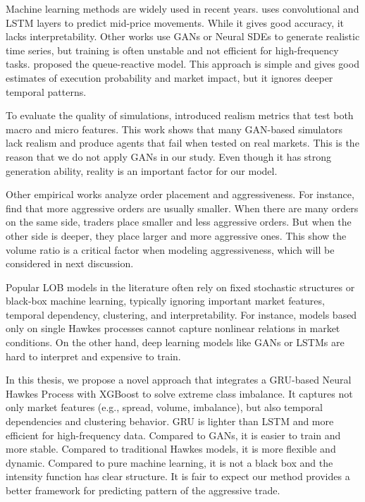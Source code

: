Machine learning methods are widely used in recent years. \cite{briola_deep_2024} uses convolutional and LSTM layers to predict mid-price movements. While it gives good accuracy, it lacks interpretability. Other works use GANs \citep{brophy_quick_2019} or Neural SDEs \citep{issa_non-adversarial_2023} to generate realistic time series, but training is often unstable and not efficient for high-frequency tasks. \cite{huang_simulating_2014} proposed the queue-reactive model. This approach is simple and gives good estimates of execution probability and market impact, but it ignores deeper temporal patterns.

To evaluate the quality of simulations, \cite{vyetrenko_get_2019} introduced realism metrics that test both macro and micro features. This work shows that many GAN-based simulators lack realism and produce agents that fail when tested on real markets. This is the reason that we do not apply GANs in our study. Even though it has strong generation ability, reality is an important factor for our model.

Other empirical works analyze order placement and aggressiveness. For instance, \cite{lo_order_2010} find that more aggressive orders are usually smaller. When there are many orders on the same side, traders place smaller and less aggressive orders. But when the other side is deeper, they place larger and more aggressive ones. This show the volume ratio is a critical factor when modeling aggressiveness, which will be considered in next discussion.



Popular LOB models in the literature often rely on fixed stochastic structures or black-box machine learning, typically ignoring important market features, temporal dependency, clustering, and interpretability. For instance, models based only on single Hawkes processes cannot capture nonlinear relations in market conditions. On the other hand, deep learning models like GANs or LSTMs are hard to interpret and expensive to train.

In this thesis, we propose a novel approach that integrates a GRU-based Neural Hawkes Process with XGBoost to solve extreme class imbalance. It captures not only market features (e.g., spread, volume, imbalance), but also temporal dependencies and clustering behavior. GRU is lighter than LSTM and more efficient for high-frequency data. Compared to GANs, it is easier to train and more stable. Compared to traditional Hawkes models, it is more flexible and dynamic. Compared to pure machine learning, it is not a black box and the intensity function has clear structure. It is fair to expect our method provides a better framework for predicting pattern of the aggressive trade.

